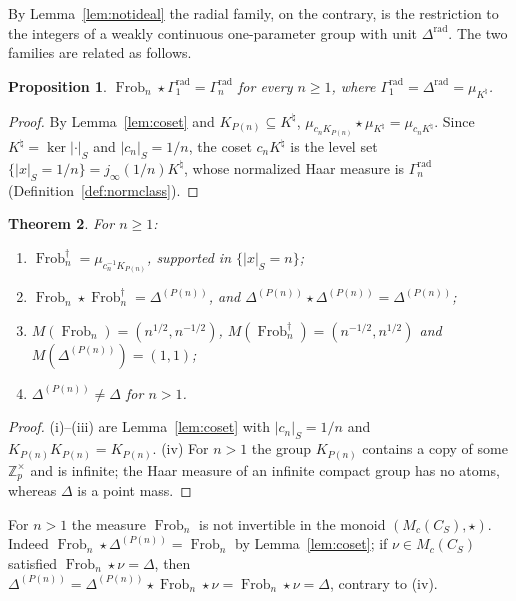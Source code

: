 \documentclass[11pt]{amsart}
\newtheorem{theorem}{Theorem}[section]
\newtheorem{proposition}[theorem]{Proposition}
\theoremstyle{definition}
\newcommand{\Z}{\mathbb Z}
\newcommand{\Frob}{\operatorname{Frob}}
\newcommand{\Knat}{K^{\natural}}
\begin{document}
By Lemma~\ref{lem:notideal} the radial family, on the contrary, is the
restriction to the integers of a weakly continuous one-parameter group with
unit $\Delta^{\mathrm{rad}}$. The two families are related as follows.

\begin{proposition}\label{prop:avgtorad}
$\Frob_n\star\Gamma_1^{\mathrm{rad}}=\Gamma_n^{\mathrm{rad}}$ for every
$n\ge1$, where $\Gamma_1^{\mathrm{rad}}=\Delta^{\mathrm{rad}}=\mu_{\Knat}$.
\end{proposition}

\begin{proof}
By Lemma~\ref{lem:coset} and $K_{P(n)}\subseteq\Knat$,
$\mu_{c_nK_{P(n)}}\star\mu_{\Knat}=\mu_{c_n\Knat}$. Since
$\Knat=\ker|\cdot|_S$ and $|c_n|_S=1/n$, the coset $c_n\Knat$ is the level
set $\{|x|_S=1/n\}=j_\infty(1/n)\Knat$, whose normalized Haar measure is
$\Gamma_n^{\mathrm{rad}}$ (Definition~\ref{def:normclass}).
\end{proof}

\begin{theorem}\label{thm:frobdagger}
For $n\ge1$:
\begin{enumerate}
\item[(i)] $\Frob_n^\dagger=\mu_{c_n^{-1}K_{P(n)}}$, supported in
$\{|x|_S=n\}$;
\item[(ii)] $\Frob_n\star\Frob_n^\dagger=\Delta^{(P(n))}$, and
$\Delta^{(P(n))}\star\Delta^{(P(n))}=\Delta^{(P(n))}$;
\item[(iii)] $M(\Frob_n)=(n^{1/2},n^{-1/2})$,
$M(\Frob_n^\dagger)=(n^{-1/2},n^{1/2})$ and $M(\Delta^{(P(n))})=(1,1)$;
\item[(iv)] $\Delta^{(P(n))}\ne\Delta$ for $n>1$.
\end{enumerate}
\end{theorem}

\begin{proof}
(i)--(iii) are Lemma~\ref{lem:coset} with $|c_n|_S=1/n$ and
$K_{P(n)}K_{P(n)}=K_{P(n)}$. (iv) For $n>1$ the group $K_{P(n)}$ contains a
copy of some $\Z_p^\times$ and is infinite; the Haar measure of an infinite
compact group has no atoms, whereas $\Delta$ is a point mass.
\end{proof}

For $n>1$ the measure $\Frob_n$ is not invertible in the monoid
$(M_c(C_S),\star)$. Indeed $\Frob_n\star\Delta^{(P(n))}=\Frob_n$ by
Lemma~\ref{lem:coset}; if $\nu\in M_c(C_S)$ satisfied $\Frob_n\star\nu=\Delta$,
then $\Delta^{(P(n))}=\Delta^{(P(n))}\star\Frob_n\star\nu=\Frob_n\star\nu
=\Delta$, contrary to (iv).
\end{document}
